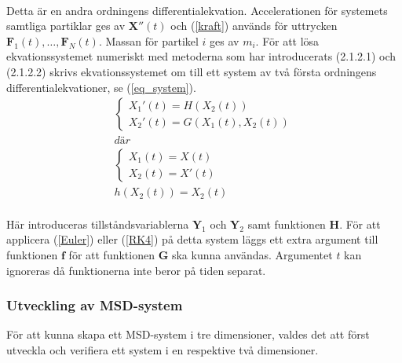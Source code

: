 \documentclass[a4paper,12pt,oneside,final,swedish]{extarticle}
\begin{document}
\\Detta är en andra ordningens differentialekvation. Accelerationen för systemets samtliga partiklar ges av \begin{math}\mathbf X''(t) \end{math} och (\ref{kraft}) används för uttrycken \begin{math}\mathbf F_1(t), …,\mathbf F_N(t) \end{math}. Massan för partikel $i$ ges av $m_i$. För att lösa ekvationssystemet numeriskt med metoderna som har introducerats (2.1.2.1) och (2.1.2.2) skrivs ekvationssystemet om till ett system av två första ordningens differentialekvationer, se (\ref{eq_system}).
\begin{equation}
\begin{split}
  \begin{cases}
    { X }_{ 1 }'(t)=H(X_{ 2 }(t))\\
    { X }_{ 2 }'(t)=G(X_{ 1 }(t),X_{ 2 }(t))
  \end{cases}\\
  där\\
  \begin{cases}
    { X }_{ 1 }(t)=X(t)\\
    { X }_{ 2 }(t)={ X }'(t)
  \end{cases}\\
  h(X_{ 2 }(t))=X_{ 2 }(t)
\end{split}
\label{eq_system}
\end{equation}
\\Här introduceras tillståndsvariablerna \begin{math}\mathbf Y_1 \end{math} och \begin{math}\mathbf Y_2 \end{math} samt funktionen \begin{math}\mathbf H \end{math}. För att applicera (\ref{Euler}) eller (\ref{RK4}) på detta system läggs ett extra argument till funktionen \begin{math}\mathbf f \end{math} för att funktionen \begin{math}\mathbf G \end{math} ska kunna användas. Argumentet $t$ kan ignoreras då funktionerna inte beror på tiden separat.

\subsubsection{Utveckling av MSD-system}
För att kunna skapa ett MSD-system i tre dimensioner, valdes det att först utveckla och verifiera ett system i en respektive två dimensioner.
\end{document}
